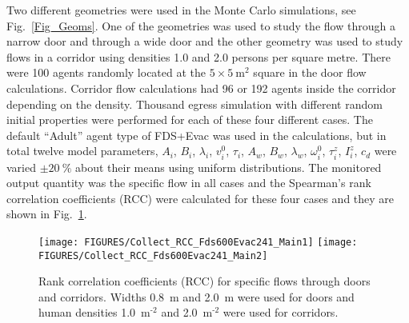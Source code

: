 \documentclass[12pt,a4paper,final,twoside]{stylevk}
\begin{document}
Two different geometries were used in the Monte Carlo simulations, see
Fig.~\ref{Fig_Geoms}. One of the geometries was used to study the
flow through a narrow door and through a wide door and the other
geometry was used to study flows in a corridor using densities 1.0 and
2.0 persons per square metre.  There were 100 agents randomly located
at the $5 \times 5 ~\mathrm{ \textrm{m}^\textrm{2} } $ square in the
door flow calculations.  Corridor flow calculations had 96 or 192
agents inside the corridor depending on the density.  Thousand egress
simulation with different random initial properties were performed for
each of these four different cases.  The default ``Adult'' agent type
of FDS+Evac was used in the calculations, but in total twelve model
parameters, $A_i$, $B_i$, $\lambda_i$, $v^0_i$, $\tau_i$, $A_w$,
$B_w$, $\lambda_w$, $\omega^0_i$, $\tau^z_i$, $I^z_{i}$, $c_d$ were
varied $\pm 20~\%$ about their means using uniform distributions.  The
monitored output quantity was the specific flow in all cases and the
Spearman's rank correlation coefficients (RCC) were calculated for
these four cases and they are shown in Fig.~\ref{Fig_RCC}.

%
\begin{figure}[!tb]
  \centerline{\texttt{[image: FIGURES/Collect\_RCC\_Fds600Evac241\_Main1]}  
      \texttt{[image: FIGURES/Collect\_RCC\_Fds600Evac241\_Main2]} } 
  \caption{Rank correlation coefficients (RCC) for specific flows
    through doors and corridors.  Widths 0.8~m and 2.0~m were used for
    doors and human densities 1.0~$\mathrm{ \textrm{m}^\textrm{-2} } $
    and 2.0~$\mathrm{ \textrm{m}^\textrm{-2} } $ were used for
    corridors.\protect\hspace{200mm}}\label{Fig_RCC}
\end{figure}
%
\end{document}
